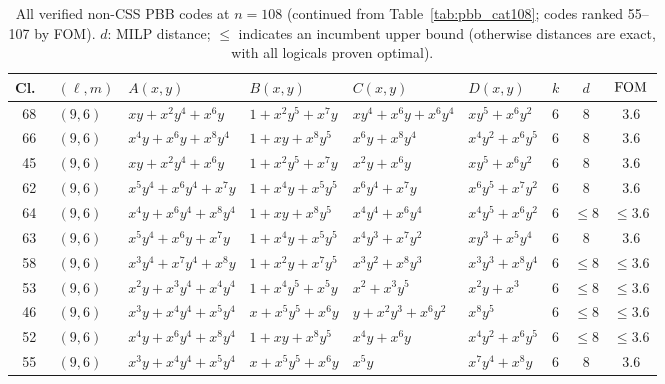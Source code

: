 \begin{table}[t]
\centering
\caption{All verified non-CSS PBB codes at $n = 108$ (continued from Table~\ref{tab:pbb_cat108}; codes ranked 55--107 by FOM).
$d$: MILP distance; $\leq$ indicates an incumbent upper bound (otherwise distances are exact, with all logicals proven optimal).}
\label{tab:pbb_cat108_b}
\tiny
\renewcommand{\arraystretch}{0.82}
\setlength{\tabcolsep}{1.5pt}
\begin{tabular*}{\textwidth}{@{\extracolsep{\fill}}cllllllcc}
\toprule
Cl.\ & $(\ell,m)$ & $A(x,y)$ & $B(x,y)$ & $C(x,y)$ & $D(x,y)$ & $k$ & $d$ & $\mathrm{FOM}$ \\
\midrule
68 & $(9,6)$ & $xy{+}x^{2}y^{4}{+}x^{6}y$ & $1{+}x^{2}y^{5}{+}x^{7}y$ & $xy^{4}{+}x^{6}y{+}x^{6}y^{4}$ & $xy^{5}{+}x^{6}y^{2}$ & 6 & 8 & 3.6 \\
66 & $(9,6)$ & $x^{4}y{+}x^{6}y{+}x^{8}y^{4}$ & $1{+}xy{+}x^{8}y^{5}$ & $x^{6}y{+}x^{8}y^{4}$ & $x^{4}y^{2}{+}x^{6}y^{5}$ & 6 & 8 & 3.6 \\
45 & $(9,6)$ & $xy{+}x^{2}y^{4}{+}x^{6}y$ & $1{+}x^{2}y^{5}{+}x^{7}y$ & $x^{2}y{+}x^{6}y$ & $xy^{5}{+}x^{6}y^{2}$ & 6 & 8 & 3.6 \\
62 & $(9,6)$ & $x^{5}y^{4}{+}x^{6}y^{4}{+}x^{7}y$ & $1{+}x^{4}y{+}x^{5}y^{5}$ & $x^{6}y^{4}{+}x^{7}y$ & $x^{6}y^{5}{+}x^{7}y^{2}$ & 6 & 8 & 3.6 \\
64 & $(9,6)$ & $x^{4}y{+}x^{6}y^{4}{+}x^{8}y^{4}$ & $1{+}xy{+}x^{8}y^{5}$ & $x^{4}y^{4}{+}x^{6}y^{4}$ & $x^{4}y^{5}{+}x^{6}y^{2}$ & 6 & $\leq$8 & $\leq$3.6 \\
63 & $(9,6)$ & $x^{5}y^{4}{+}x^{6}y{+}x^{7}y$ & $1{+}x^{4}y{+}x^{5}y^{5}$ & $x^{4}y^{3}{+}x^{7}y^{2}$ & $xy^{3}{+}x^{5}y^{4}$ & 6 & 8 & 3.6 \\
58 & $(9,6)$ & $x^{3}y^{4}{+}x^{7}y^{4}{+}x^{8}y$ & $1{+}x^{2}y{+}x^{7}y^{5}$ & $x^{3}y^{2}{+}x^{8}y^{3}$ & $x^{3}y^{3}{+}x^{8}y^{4}$ & 6 & $\leq$8 & $\leq$3.6 \\
53 & $(9,6)$ & $x^{2}y{+}x^{3}y^{4}{+}x^{4}y^{4}$ & $1{+}x^{4}y^{5}{+}x^{5}y$ & $x^{2}{+}x^{3}y^{5}$ & $x^{2}y{+}x^{3}$ & 6 & $\leq$8 & $\leq$3.6 \\
46 & $(9,6)$ & $x^{3}y{+}x^{4}y^{4}{+}x^{5}y^{4}$ & $x{+}x^{5}y^{5}{+}x^{6}y$ & $y{+}x^{2}y^{3}{+}x^{6}y^{2}$ & $x^{8}y^{5}$ & 6 & $\leq$8 & $\leq$3.6 \\
52 & $(9,6)$ & $x^{4}y{+}x^{6}y^{4}{+}x^{8}y^{4}$ & $1{+}xy{+}x^{8}y^{5}$ & $x^{4}y{+}x^{6}y$ & $x^{4}y^{2}{+}x^{6}y^{5}$ & 6 & $\leq$8 & $\leq$3.6 \\
55 & $(9,6)$ & $x^{3}y{+}x^{4}y^{4}{+}x^{5}y^{4}$ & $x{+}x^{5}y^{5}{+}x^{6}y$ & $x^{5}y$ & $x^{7}y^{4}{+}x^{8}y$ & 6 & 8 & 3.6 \\

\end{tabular*}
\end{table}
